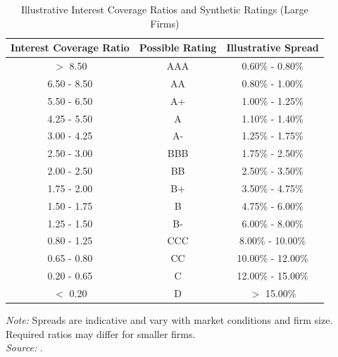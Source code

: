 \begin{table}[H]
    \centering
    \caption{Illustrative Interest Coverage Ratios and Synthetic Ratings (Large Firms)}
    \label{tab:interest_coverage_ratings}
    \vspace{2mm}
    \begin{tabular}{|c|c|c|}
        \hline
        \textbf{Interest Coverage Ratio} & \textbf{Possible Rating} & \textbf{Illustrative Spread} \\
        \hline
        \(>\) 8.50                       & AAA                      & 0.60\% - 0.80\%              \\
        6.50 - 8.50                      & AA                       & 0.80\% - 1.00\%              \\
        5.50 - 6.50                      & A+                       & 1.00\% - 1.25\%              \\
        4.25 - 5.50                      & A                        & 1.10\% - 1.40\%              \\
        3.00 - 4.25                      & A-                       & 1.25\% - 1.75\%              \\
        2.50 - 3.00                      & BBB                      & 1.75\% - 2.50\%              \\
        2.00 - 2.50                      & BB                       & 2.50\% - 3.50\%              \\
        1.75 - 2.00                      & B+                       & 3.50\% - 4.75\%              \\
        1.50 - 1.75                      & B                        & 4.75\% - 6.00\%              \\
        1.25 - 1.50                      & B-                       & 6.00\% - 8.00\%              \\
        0.80 - 1.25                      & CCC                      & 8.00\% - 10.00\%             \\
        0.65 - 0.80                      & CC                       & 10.00\% - 12.00\%            \\
        0.20 - 0.65                      & C                        & 12.00\% - 15.00\%            \\
        \(<\) 0.20                       & D                        & \(>\) 15.00\%                \\
        \hline
    \end{tabular}

    \vspace{2mm}
    \raggedright \footnotesize
    \textit{Note:} Spreads are indicative and vary with market conditions and firm size. Required ratios may differ for smaller firms.\\
    \textit{Source:} \textcite{damodaran_data_2025}.
\end{table}

